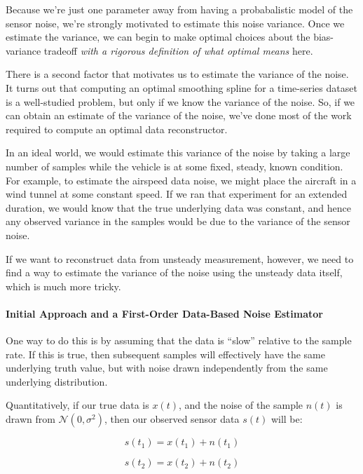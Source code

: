 \documentclass[11pt]{article}
\begin{document}
Because we're just one parameter away from having a probabalistic model
of the sensor noise, we're strongly motivated to estimate this noise
variance. Once we estimate the variance, we can begin to make optimal
choices about the bias-variance tradeoff \emph{with a rigorous
definition of what optimal means} here.

There is a second factor that motivates us to estimate the variance of
the noise. It turns out that computing an optimal smoothing spline for a
time-series dataset is a well-studied problem, but only if we know the
variance of the noise. So, if we can obtain an estimate of the variance
of the noise, we've done most of the work required to compute an optimal
data reconstructor.

In an ideal world, we would estimate this variance of the noise by
taking a large number of samples while the vehicle is at some fixed,
steady, known condition. For example, to estimate the airspeed data
noise, we might place the aircraft in a wind tunnel at some constant
speed. If we ran that experiment for an extended duration, we would know
that the true underlying data was constant, and hence any observed
variance in the samples would be due to the variance of the sensor
noise.

If we want to reconstruct data from unsteady measurement, however, we
need to find a way to estimate the variance of the noise using the
unsteady data itself, which is much more tricky.

    \hypertarget{initial-approach-and-a-first-order-data-based-noise-estimator}{%
\paragraph{Initial Approach and a First-Order Data-Based Noise
Estimator}\label{initial-approach-and-a-first-order-data-based-noise-estimator}}

One way to do this is by assuming that the data is ``slow'' relative to
the sample rate. If this is true, then subsequent samples will
effectively have the same underlying truth value, but with noise drawn
independently from the same underlying distribution.

Quantitatively, if our true data is \(x(t)\), and the noise of the
sample \(n(t)\) is drawn from \(\mathcal{N}(0, \sigma^2)\), then our
observed sensor data \(s(t)\) will be:

\[s(t_1) = x(t_1) + n(t_1)\]

\[s(t_2) = x(t_2) + n(t_2)\]
\end{document}
